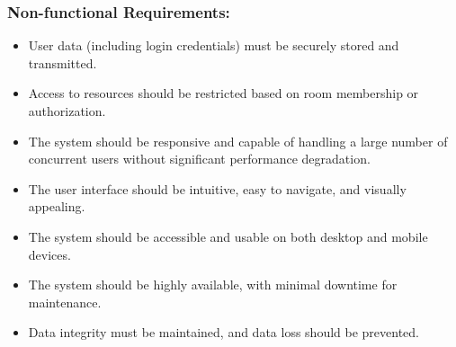     \subsubsection{Non-functional Requirements:}
    \begin{itemize}
        \item User data (including login credentials) must be securely stored and transmitted.
        \item Access to resources should be restricted based on room membership or authorization.
        \item The system should be responsive and capable of handling a large number of concurrent users without significant performance degradation.
        \item The user interface should be intuitive, easy to navigate, and visually appealing.
        \item The system should be accessible and usable on both desktop and mobile devices.
        \item The system should be highly available, with minimal downtime for maintenance.
        \item Data integrity must be maintained, and data loss should be prevented.
    \end{itemize}
 
\newpage